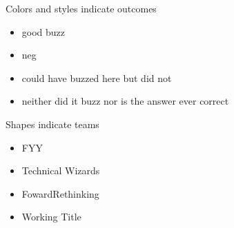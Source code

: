 \begin{frame}
\begin{block}{Colors and styles indicate outcomes}
\begin{itemize}
    \item[]  good buzz
    \item[]  neg
    \item[]  could have buzzed here but did not
    \item[]  neither did it buzz nor is the answer ever correct
\end{itemize}
\end{block}
\begin{block}{Shapes indicate teams}
\begin{itemize}
    \item[]  FYY
    \item[]  Technical Wizards
    \item[]  FowardRethinking
    \item[]  Working Title
\end{itemize}
\end{block}
\end{frame}
